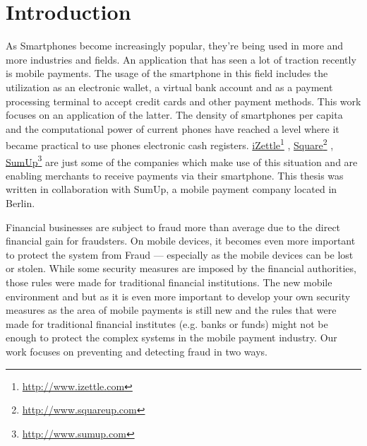 \documentclass[a4paper, oneside]{csthesis}
\newcommand\fnurl[2]{%
  \href{#2}{#1}\footnote{\url{#2}}%
}
\begin{document}
\tableofcontents

\mainmatter %



\chapter{Introduction}

As Smartphones become increasingly popular, they're being used in more and more industries and fields. An application that has seen a lot of traction recently is mobile payments. The usage of the smartphone in this field includes the utilization as an electronic wallet, a virtual bank account and as a payment processing terminal to accept credit cards and other payment methods.
This work focuses on an application of the latter.
The density of smartphones per capita and the computational power of current phones have reached a level where it became practical to use phones electronic cash registers.
\fnurl{iZettle}{http://www.izettle.com}, \fnurl{Square}{http://www.squareup.com}, \fnurl{SumUp}{http://www.sumup.com} are just some of the companies which make use of this situation and are enabling merchants to receive payments via their smartphone. This thesis was written in collaboration with SumUp, a mobile payment company located in Berlin. %


Financial businesses are subject to fraud more than average due to the direct financial gain for fraudsters. On mobile devices, it becomes even more important to protect the system from Fraud --- especially as the mobile devices can be lost or stolen. While some security measures are imposed by the financial authorities, those rules were made for traditional financial institutions. The new mobile environment and  but as it is even more important to develop your own security measures as the area of mobile payments is still new and the rules that were made for traditional financial institutes (e.g. banks or funds)
might not be enough to protect the complex systems in the mobile payment industry.
Our work focuses on preventing and detecting fraud in two ways.
\end{document}
